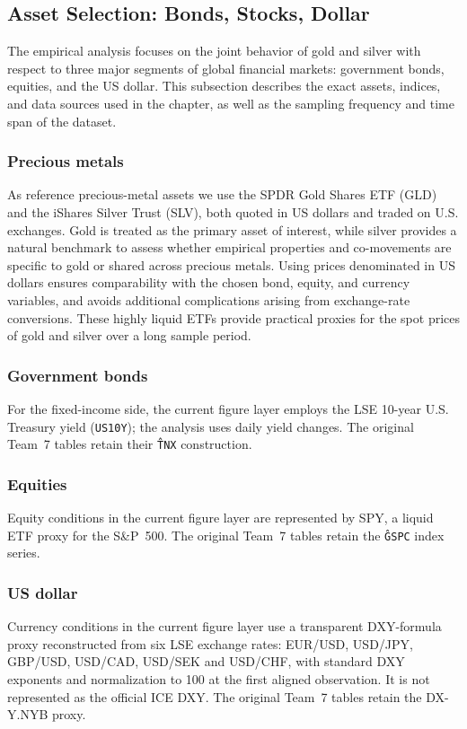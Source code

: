 \subsection{Asset Selection: Bonds, Stocks, Dollar}
The empirical analysis focuses on the joint behavior of gold and silver with respect to
three major segments of global financial markets: government bonds, equities, and the US
dollar. This subsection describes the exact assets, indices, and data sources used in the
chapter, as well as the sampling frequency and time span of the dataset.
\subsubsection{Precious metals}

As reference precious-metal assets we use the SPDR Gold Shares ETF (GLD) and the iShares Silver Trust (SLV), both quoted in US dollars and traded on U.S. exchanges. Gold is treated as the primary asset of interest, while silver provides a
natural benchmark to assess whether empirical properties and co-movements are specific to
gold or shared across precious metals. Using prices denominated in US dollars ensures
comparability with the chosen bond, equity, and currency variables, and avoids additional
complications arising from exchange-rate conversions. These highly liquid ETFs provide practical proxies for the spot prices of gold and silver over a long sample period.
\subsubsection{Government bonds}

For the fixed-income side, the current figure layer employs the LSE 10-year
U.S. Treasury yield (\texttt{US10Y}); the analysis uses daily yield changes.
The original Team~7 tables retain their \texttt{\^TNX} construction.
\subsubsection{Equities}

Equity conditions in the current figure layer are represented by SPY, a
liquid ETF proxy for the S\&P~500. The original Team~7 tables retain the
\texttt{\^GSPC} index series.
\subsubsection{US dollar}

Currency conditions in the current figure layer use a transparent DXY-formula
proxy reconstructed from six LSE exchange rates: EUR/USD, USD/JPY, GBP/USD,
USD/CAD, USD/SEK and USD/CHF, with standard DXY exponents and normalization to
100 at the first aligned observation. It is not represented as the official
ICE DXY. The original Team~7 tables retain the DX-Y.NYB proxy.
